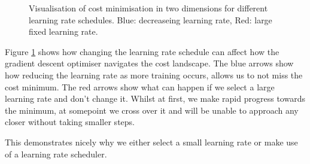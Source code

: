 \begin{figure}[h]
\begin{center}
\caption{Visualisation of cost minimisation in two dimensions for different learning rate schedules. Blue: decreaseing learning rate, Red: large fixed learning rate.}
\label{fig:lr_schedule}
\end{center}
\end{figure}

Figure \ref{fig:lr_schedule} shows how changing the learning rate schedule can affect how the gradient descent optimiser navigates the cost landscape. The blue arrows show how reducing the learning rate as more training occurs, allows us to not miss the cost minimum. The red arrows show what can happen if we select a large learning rate and don't change it. Whilst at first, we make rapid progress towards the minimum, at somepoint we cross over it and will be unable to approach any closer without taking smaller steps.

This demonstrates nicely why we either select a small learning rate or make use of a learning rate scheduler.


